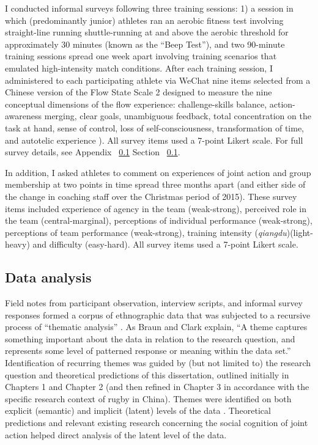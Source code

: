     I conducted informal surveys following three training sessions: 1) a session in which (predominantly junior) athletes ran an aerobic fitness test involving straight-line running shuttle-running at and above the aerobic threshold for approximately 30 minutes (known as the ``Beep Test''), and two 90-minute training sessions spread one week apart involving training scenarios that emulated high-intensity match conditions.  After each training session, I administered to each participating athlete via WeChat nine items selected from a Chinese version of the Flow State Scale 2 \citep{Liu2012} designed to measure the nine conceptual dimensions of the flow experience: challenge-skills balance, action-awareness merging, clear goals, unambiguous feedback, total concentration on the task at hand, sense of control, loss of self-consciousness, transformation of time, and autotelic experience \citep{Csikszentmihalyi1990}).  All survey items used a 7-point Likert scale. For full survey details, see Appendix ~\ref{} Section ~\ref{}.


    In addition, I asked athletes to comment on experiences of joint action and group membership at two points in time spread three months apart (and either side of the change in coaching staff over the Christmas period of 2015).  These survey items included experience of agency in the team (weak-strong), perceived role in the team (central-marginal), perceptions of individual performance (weak-strong), perceptions of team performance (weak-strong), training intensity (\textit{qiangdu})(light-heavy) and difficulty (easy-hard).  All survey items used a 7-point Likert scale.



\subsection{Data analysis}
Field notes from participant observation, interview scripts, and informal survey responses formed a corpus of ethnographic data that was subjected to a recursive process of ``thematic analysis'' \citep{Braun2006}.  As Braun and Clark \textcite[10]{Braun2006} explain, ``A theme captures something important about the data in relation to the research question, and represents some level of patterned response or meaning within the data set.'' Identification of recurring themes was guided by (but not limited to) the research question and theoretical predictions of this dissertation, outlined initially in Chapters 1 and Chapter 2 (and then refined in Chapter 3 in accordance with the specific research context of rugby in China).  Themes were identified on both explicit (semantic) and implicit (latent) levels of the data \citep{Boyatzis1998}. Theoretical predictions and relevant existing research concerning the social cognition of joint action helped direct analysis of the latent level of the data.

